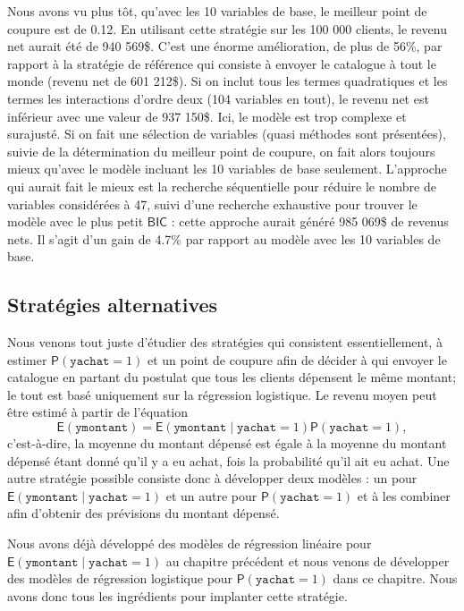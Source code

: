 \documentclass[
  11pt,
  letterpaper,
]{book}
\theoremstyle{definition}
\theoremstyle{definition}
\theoremstyle{definition}
\theoremstyle{remark}
\begin{document}
Nous avons vu plus tôt, qu'avec les 10 variables de base, le meilleur point de coupure est de 0.12. En utilisant cette stratégie sur les 100 000 clients, le revenu net aurait été de 940 569\$. C'est une énorme amélioration, de plus de 56\%, par rapport à la stratégie de référence qui consiste à envoyer le catalogue à tout le monde (revenu net de 601 212\$). Si on inclut tous les termes quadratiques et les termes les interactions d'ordre deux (104 variables en tout), le revenu net est inférieur avec une valeur de 937 150\$. Ici, le modèle est trop complexe et surajusté. Si on fait une sélection de variables (quasi méthodes sont présentées), suivie de la détermination du meilleur point de coupure, on fait alors toujours mieux qu'avec le modèle incluant les 10 variables de base seulement. L'approche qui aurait fait le mieux est la recherche séquentielle pour réduire le nombre de variables considérées à 47, suivi d'une recherche exhaustive pour trouver le modèle avec le plus petit \(\mathsf{BIC}\) : cette approche aurait généré 985 069\$ de revenus nets. Il s'agit d'un gain de 4.7\% par rapport au modèle avec les 10 variables de base.

\hypertarget{stratuxe9gies-alternatives}{%
\subsection{Stratégies alternatives}\label{stratuxe9gies-alternatives}}

Nous venons tout juste d'étudier des stratégies qui consistent essentiellement, à estimer \({\mathsf P}\left(\texttt{yachat}=1\right)\) et un point de coupure afin de décider à qui envoyer le catalogue en partant du postulat que tous les clients dépensent le même montant; le tout est basé uniquement sur la régression logistique. Le revenu moyen peut être estimé à partir de l'équation
\[{\mathsf E}\left(\texttt{ymontant}\right) = {\mathsf E}\left(\texttt{ymontant} \mid \texttt{yachat}=1\right) {\mathsf P}\left(\texttt{yachat
}=1\right),
\]
c'est-à-dire, la moyenne du montant dépensé est égale à la moyenne du montant dépensé étant donné qu'il y a eu achat, fois la probabilité qu'il ait eu achat. Une autre stratégie possible consiste donc à développer deux modèles : un pour \({\mathsf E}\left(\texttt{ymontant} \mid \texttt{yachat}=1\right)\) et un autre pour \({\mathsf P}\left(\texttt{yachat}=1\right)\) et à les combiner afin d'obtenir des prévisions du montant dépensé.

Nous avons déjà développé des modèles de régression linéaire pour \({\mathsf E}\left(\texttt{ymontant} \mid \texttt{yachat}=1\right)\) au chapitre précédent et nous venons de développer des modèles de régression logistique pour \({\mathsf P}\left(\texttt{yachat}=1\right)\) dans ce chapitre. Nous avons donc tous les ingrédients pour implanter cette stratégie.
\end{document}
